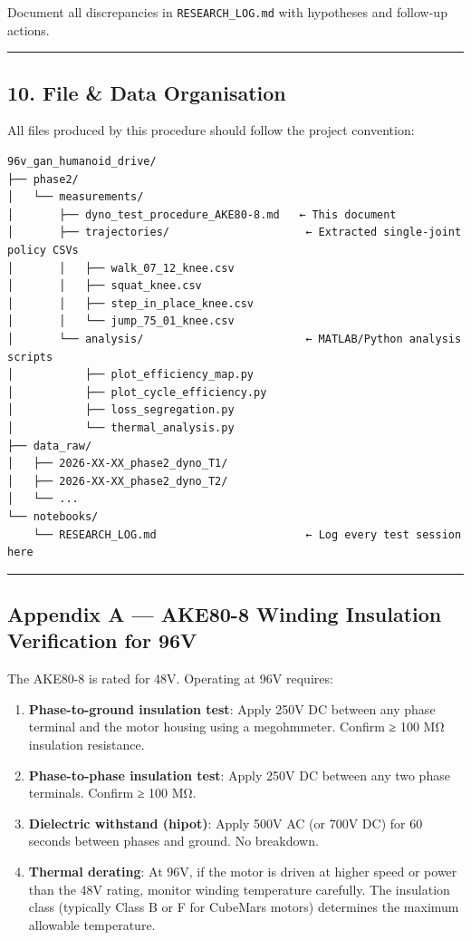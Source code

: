 \documentclass[
]{article}
\providecommand{\tightlist}{%
  \setlength{\itemsep}{0pt}\setlength{\parskip}{0pt}}
\begin{document}
Document all discrepancies in \texttt{RESEARCH\_LOG.md} with hypotheses
and follow-up actions.

\begin{center}\rule{0.5\linewidth}{0.5pt}\end{center}

\subsection{10. File \& Data Organisation}\label{file-data-organisation}

All files produced by this procedure should follow the project
convention:

\begin{verbatim}
96v_gan_humanoid_drive/
├── phase2/
│   └── measurements/
│       ├── dyno_test_procedure_AKE80-8.md   ← This document
│       ├── trajectories/                     ← Extracted single-joint policy CSVs
│       │   ├── walk_07_12_knee.csv
│       │   ├── squat_knee.csv
│       │   ├── step_in_place_knee.csv
│       │   └── jump_75_01_knee.csv
│       └── analysis/                         ← MATLAB/Python analysis scripts
│           ├── plot_efficiency_map.py
│           ├── plot_cycle_efficiency.py
│           ├── loss_segregation.py
│           └── thermal_analysis.py
├── data_raw/
│   ├── 2026-XX-XX_phase2_dyno_T1/
│   ├── 2026-XX-XX_phase2_dyno_T2/
│   └── ...
└── notebooks/
    └── RESEARCH_LOG.md                       ← Log every test session here
\end{verbatim}

\begin{center}\rule{0.5\linewidth}{0.5pt}\end{center}

\subsection{Appendix A --- AKE80-8 Winding Insulation Verification for
96V}\label{appendix-a-ake80-8-winding-insulation-verification-for-96v}

The AKE80-8 is rated for 48V. Operating at 96V requires:

\begin{enumerate}
\def\labelenumi{\arabic{enumi}.}
\tightlist
\item
  \textbf{Phase-to-ground insulation test}: Apply 250V DC between any
  phase terminal and the motor housing using a megohmmeter. Confirm ≥
  100 MΩ insulation resistance.
\item
  \textbf{Phase-to-phase insulation test}: Apply 250V DC between any two
  phase terminals. Confirm ≥ 100 MΩ.
\item
  \textbf{Dielectric withstand (hipot)}: Apply 500V AC (or 700V DC) for
  60 seconds between phases and ground. No breakdown.
\item
  \textbf{Thermal derating}: At 96V, if the motor is driven at higher
  speed or power than the 48V rating, monitor winding temperature
  carefully. The insulation class (typically Class B or F for CubeMars
  motors) determines the maximum allowable temperature.
\end{enumerate}
\end{document}
